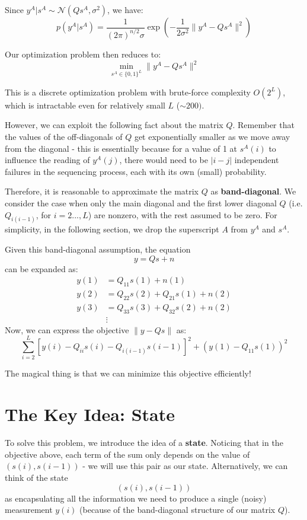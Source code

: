 \documentclass{article}
\begin{document}
Since $y^A | s^A \sim \mathcal{N}(Qs^A, \sigma^2)$, we have:
\[ p(y^A | s^A) = \frac{1}{(2\pi)^{n/2} \sigma} \exp \left( {-\frac{1}{2\sigma^2} \|y^A - Qs^A\|^2} \right) \]

Our optimization problem then reduces to:
\[ \min_{s^A \in \{0, 1\}^L}  \|y^A - Qs^A\|^2 \]

This is a discrete optimization problem with brute-force complexity $O(2^L)$, which is intractable
even for relatively small $L$ ($\sim 200)$.

However, we can exploit the following fact about the matrix $Q$. Remember that the values of the off-diagonals of $Q$ get
exponentially smaller as we move away from the diagonal - this is essentially because for a value of 1 at $s^A(i)$ to influence
the reading of $y^A(j)$, there would need to be $\left| i-j \right|$ independent failures in the sequencing process, each with its own
(small) probability.

Therefore, it is reasonable to approximate the matrix $Q$ as \textbf{band-diagonal}. We consider the case when only the main diagonal and the first lower
diagonal $Q$ (i.e. $Q_{i(i-1)}$, for $i = 2...,L$) are nonzero, with the rest assumed to be zero. For simplicity, in the following section, we
drop the superscript $A$ from $y^A$ and $s^A$. 

Given this band-diagonal assumption, the equation
\[ y = Qs + n \]
can be expanded as:
\begin{align*}
y(1) &= Q_{11} s(1) + n(1) \\
y(2) &= Q_{22} s(2) + Q_{21} s(1) + n(2) \\
y(3) &= Q_{33} s(3) + Q_{32} s(2) + n(2) \\
&\vdots
\end{align*}
Now, we can express the objective $\| y - Qs \|$ as:
\[ \sum_{i = 2}^L \left[ y(i) - Q_{ii} s(i) - Q_{i(i-1)}s(i-1) \right]^2 + (y(1) - Q_{11}s(1))^2 \]

The magical thing is that we can minimize this objective efficiently!

\section*{The Key Idea: State}
To solve this problem, we introduce the idea of a \textbf{state}. Noticing that in the objective above,
each term of the sum only depends on the value of $(s(i), s(i-1))$ - we will use this pair as our state.
Alternatively, we can think of the state 
\[(s(i), s(i-1))\]
 as encapsulating all the information we need
to produce a single (noisy) measurement $y(i)$ (because of the band-diagonal structure
of our matrix $Q$).
\end{document}
